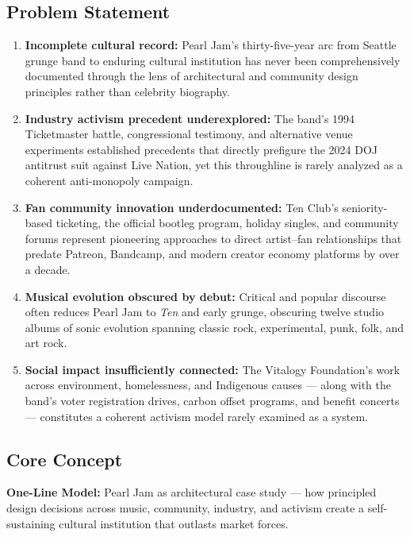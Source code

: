 \documentclass[11pt,letterpaper]{article}
\begin{document}
\subsection{Problem Statement}

\begin{enumerate}[label=\textbf{\arabic*.}]
\item \textbf{Incomplete cultural record:} Pearl Jam's thirty-five-year arc from Seattle grunge band to enduring cultural institution has never been comprehensively documented through the lens of architectural and community design principles rather than celebrity biography.

\item \textbf{Industry activism precedent underexplored:} The band's 1994 Ticketmaster battle, congressional testimony, and alternative venue experiments established precedents that directly prefigure the 2024 DOJ antitrust suit against Live Nation, yet this throughline is rarely analyzed as a coherent anti-monopoly campaign.

\item \textbf{Fan community innovation underdocumented:} Ten Club's seniority-based ticketing, the official bootleg program, holiday singles, and community forums represent pioneering approaches to direct artist--fan relationships that predate Patreon, Bandcamp, and modern creator economy platforms by over a decade.

\item \textbf{Musical evolution obscured by debut:} Critical and popular discourse often reduces Pearl Jam to \textit{Ten} and early grunge, obscuring twelve studio albums of sonic evolution spanning classic rock, experimental, punk, folk, and art rock.

\item \textbf{Social impact insufficiently connected:} The Vitalogy Foundation's work across environment, homelessness, and Indigenous causes --- along with the band's voter registration drives, carbon offset programs, and benefit concerts --- constitutes a coherent activism model rarely examined as a system.
\end{enumerate}

\subsection{Core Concept}

\begin{quotebox}
\textbf{One-Line Model:} Pearl Jam as architectural case study --- how principled design decisions across music, community, industry, and activism create a self-sustaining cultural institution that outlasts market forces.
\end{quotebox}
\end{document}
